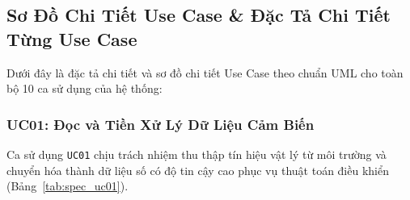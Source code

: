 \subsection{Sơ Đồ Chi Tiết Use Case \& Đặc Tả Chi Tiết Từng Use Case}
\label{sec:uc_detailed}
Dưới đây là đặc tả chi tiết và sơ đồ chi tiết Use Case theo chuẩn UML cho toàn bộ 10 ca sử dụng của hệ thống:

\subsubsection{UC01: Đọc và Tiền Xử Lý Dữ Liệu Cảm Biến}
Ca sử dụng \texttt{UC01} chịu trách nhiệm thu thập tín hiệu vật lý từ môi trường và chuyển hóa thành dữ liệu số có độ tin cậy cao phục vụ thuật toán điều khiển (Bảng~\ref{tab:spec_uc01}).

\begingroup
\small
\renewcommand{\arraystretch}{1.2}
